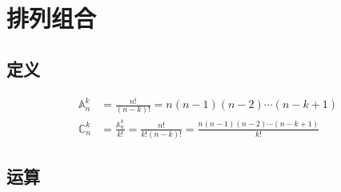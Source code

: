 \section{排列组合}
\subsection{定义}
\begin{align}
\mathbb{A}_n^k &= \frac{n!}{(n-k)!}=n(n-1)(n-2)\cdots(n-k+1) \\
\mathbb{C}_n^k &= \frac{\mathbb{A}_n^k}{k!} = \frac{n!}{k!(n-k)!}=\frac{n(n-1)(n-2)\cdots(n-k+1)}{k!}
\end{align}
\subsection{运算}
